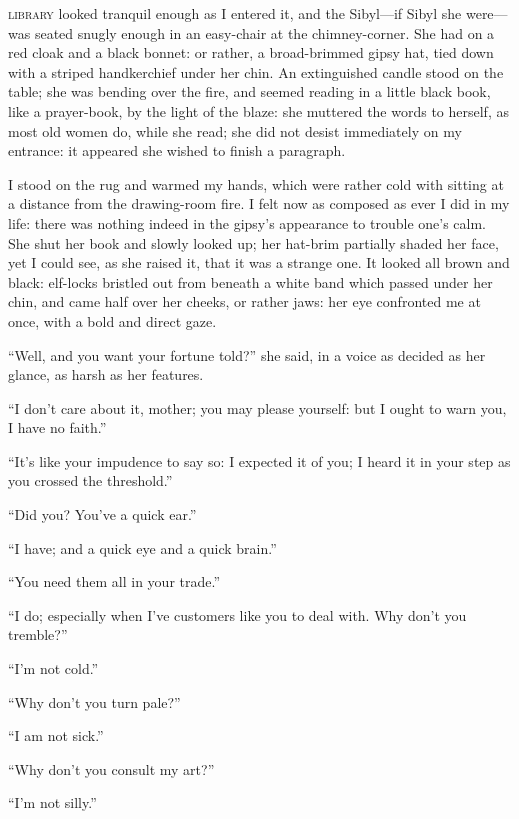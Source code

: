 
 \textsc{library} looked tranquil enough as I entered it, and the Sibyl---if
Sibyl she were---was seated snugly enough in an easy-chair at the
chimney-corner. She had on a red cloak and a black bonnet: or rather, a
broad-brimmed gipsy hat, tied down with a striped handkerchief under her
chin. An extinguished candle stood on the table; she was bending over
the fire, and seemed reading in a little black book, like a prayer-book,
by the light of the blaze: she muttered the words to herself, as most
old women do, while she read; she did not desist immediately on my
entrance: it appeared she wished to finish a paragraph.

I stood on the rug and warmed my hands, which were rather cold with
sitting at a distance from the drawing-room fire. I felt now as
composed as ever I did in my life: there was nothing indeed in the
gipsy's appearance to trouble one's calm. She shut her book and slowly
looked up; her hat-brim partially shaded her face, yet I could see, as
she raised it, that it was a strange one. It looked all brown and
black: elf-locks bristled out from beneath a white band which passed
under her chin, and came half over her cheeks, or rather jaws: her eye
confronted me at once, with a bold and direct gaze.

\enquote{Well, and you want your fortune told?} she said, in a voice as
decided as her glance, as harsh as her features.

\enquote{I don't care about it, mother; you may please yourself: but I
	ought to warn you, I have no faith.}

\enquote{It's like your impudence to say so: I expected it of you; I
	heard it in your step as you crossed the threshold.}

\enquote{Did you? You've a quick ear.}

\enquote{I have; and a quick eye and a quick brain.}

\enquote{You need them all in your trade.}

\enquote{I do; especially when I've customers like you to deal with.
	Why don't you tremble?}

\enquote{I'm not cold.}

\enquote{Why don't you turn pale?}

\enquote{I am not sick.}

\enquote{Why don't you consult my art?}

\enquote{I'm not silly.}

